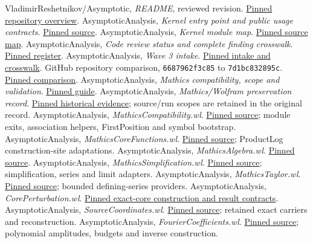 \documentclass[11pt,a4paper]{article}
\newcommand{\code}[1]{\texttt{#1}}
\newcommand{\src}[2]{\href{https://github.com/VladimirReshetnikov/Asymptotic/blob/7d1bc832895cc90a9b2a978b7b7684acab908bd2/#1}{#2}}
\begin{document}
\clearpage
\begin{thebibliography}{99}
\small
{} VladimirReshetnikov/Asymptotic, \emph{README}, reviewed revision. \src{README.md}{Pinned repository overview}.
 AsymptoticAnalysis, \emph{Kernel entry point and public usage contracts}. \src{src/Kernel/AsymptoticAnalysis.wl}{Pinned source}.
 AsymptoticAnalysis, \emph{Kernel module map}. \src{src/Kernel/README.md}{Pinned source map}.
 AsymptoticAnalysis, \emph{Code review status and complete finding crosswalk}. \src{docs/development/CODE_REVIEW_STATUS.md}{Pinned register}.
 AsymptoticAnalysis, \emph{Wave 3 intake}. \src{docs/development/WAVE_3_INTAKE.md}{Pinned intake and crosswalk}.
 GitHub repository comparison, \code{6687962f3c85} to \code{7d1bc832895c}. \href{https://github.com/VladimirReshetnikov/Asymptotic/compare/6687962f3c858a4f93623cfc496f33e35c6763d4...7d1bc832895cc90a9b2a978b7b7684acab908bd2}{Pinned comparison}.
 AsymptoticAnalysis, \emph{Mathics compatibility, scope and validation}. \src{docs/Mathics/COMPATIBILITY.md}{Pinned guide}.
 AsymptoticAnalysis, \emph{Mathics/Wolfram preservation record}. \src{validation/mathics-wolfram-preservation.json}{Pinned historical evidence}; source/run scopes are retained in the original record.
 AsymptoticAnalysis, \emph{MathicsCompatibility.wl}. \src{src/Kernel/MathicsCompatibility.wl}{Pinned source}; module exits, association helpers, FirstPosition and symbol bootstrap.
 AsymptoticAnalysis, \emph{MathicsCoreFunctions.wl}. \src{src/Kernel/MathicsCoreFunctions.wl}{Pinned source}; ProductLog construction-site adaptations.
 AsymptoticAnalysis, \emph{MathicsAlgebra.wl}. \src{src/Kernel/MathicsAlgebra.wl}{Pinned source}.
 AsymptoticAnalysis, \emph{MathicsSimplification.wl}. \src{src/Kernel/MathicsSimplification.wl}{Pinned source}; simplification, series and limit adapters.
 AsymptoticAnalysis, \emph{MathicsTaylor.wl}. \src{src/Kernel/MathicsTaylor.wl}{Pinned source}; bounded defining-series providers.
 AsymptoticAnalysis, \emph{CorePerturbation.wl}. \src{src/Kernel/CorePerturbation.wl}{Pinned exact-core construction and result contracts}.
 AsymptoticAnalysis, \emph{SourceCoordinates.wl}. \src{src/Kernel/SourceCoordinates.wl}{Pinned source}; retained exact carriers and reconstruction.
 AsymptoticAnalysis, \emph{FourierCoefficients.wl}. \src{src/Kernel/FourierCoefficients.wl}{Pinned source}; polynomial amplitudes, budgets and inverse construction.

\end{thebibliography}
\end{document}
